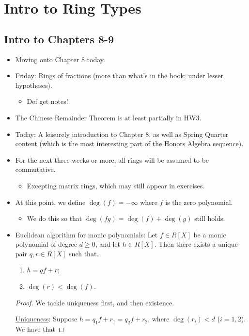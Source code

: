 \documentclass[../notes.tex]{subfiles}
\begin{document}
\chapter{Intro to Ring Types}
\section{Intro to Chapters 8-9}
\begin{itemize}
    \item {}Moving onto Chapter 8 today.
    \item Friday: Rings of fractions (more than what's in the book; under lesser hypotheses).
    \begin{itemize}
        \item Def get notes!
    \end{itemize}
    \item The Chinese Remainder Theorem is at least partially in HW3.
    \item Today: A leisurely introduction to Chapter 8, as well as Spring Quarter content (which is the most interesting part of the Honors Algebra sequence).
    \item For the next three weeks or more, all rings will be assumed to be commutative.
    \begin{itemize}
        \item Excepting matrix rings, which may still appear in exercises.
    \end{itemize}
    \item At this point, we define $\deg(f)=-\infty$ where $f$ is the zero polynomial.
    \begin{itemize}
        \item We do this so that $\deg(fg)=\deg(f)+\deg(g)$ still holds.
    \end{itemize}
    \item Euclidean algorithm for monic polynomials: Let $f\in R[X]$ be a monic polynomial of degree $d\geq 0$, and let $h\in R[X]$. Then there exists a unique pair $q,r\in R[X]$ such that\dots
    \begin{enumerate}
        \item $h=qf+r$;
        \item $\deg(r)<\deg(f)$.
    \end{enumerate}
    \begin{proof}
        We tackle uniqueness first, and then existence.\par
        \underline{Uniqueness}: Suppose $h=q_1f+r_1=q_2f+r_2$, where $\deg(r_i)<d$ ($i=1,2$). We have that

\end{proof}
\end{itemize}
\end{document}
